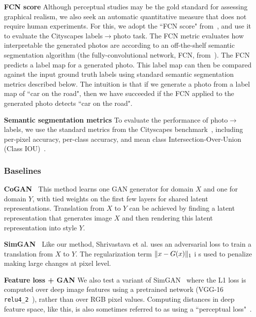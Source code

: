 {\bf FCN score} Although perceptual studies may be the gold standard for assessing graphical realism, we also seek an automatic quantitative measure that does not require human experiments. For this, we adopt the ``FCN score" from~\cite{isola2016image}, and use it to evaluate the Cityscapes labels$\rightarrow$photo task. The FCN metric evaluates how interpretable the generated photos are according to an off-the-shelf semantic segmentation algorithm (the fully-convolutional network, FCN, from~\cite{long2015fully}). The FCN predicts a label map for a generated photo. This label map can then be compared against the input ground truth labels using standard semantic segmentation metrics described below. The intuition is that if we generate a photo from a label map of ``car on the road", then we have succeeded if the FCN applied to the generated photo detects ``car on the road".

{\bf Semantic segmentation metrics} To evaluate the performance of photo$\rightarrow$labels, we use the standard metrics from the Cityscapes benchmark~\cite{Cordts2016Cityscapes}, including per-pixel accuracy, per-class accuracy, and mean class Intersection-Over-Union (Class IOU)~\cite{Cordts2016Cityscapes}.

\vspace{-1 mm}
\subsubsection{Baselines}
\vspace{-1 mm}

\hspace{4mm} {\bf CoGAN~\cite{liu2016coupled}} This method learns one GAN generator for domain $X$ and one for domain $Y$, with tied weights on the first few layers for shared latent representations. Translation from $X$ to $Y$ can be achieved by finding a latent representation that generates image $X$ and then rendering this latent representation into style $Y$.


{\bf SimGAN~\cite{shrivastava2016learning}} Like our method, Shrivastava et al. uses an adversarial loss to train a translation from $X$ to $Y$. The regularization term $\lVert x-G(x)\rVert_1$ i s used to penalize making large changes at pixel level.

{\bf Feature loss + GAN} We also test a variant of SimGAN~\cite{shrivastava2016learning} where the L1 loss is computed over deep image features using a pretrained network (VGG-16 \texttt{relu4\_2}~\cite{simonyan2014very}), rather than over RGB pixel values. Computing distances in deep feature space, like this, is also sometimes referred to as using a ``perceptual loss"~\cite{dosovitskiy2016generating,johnson2016perceptual}.

